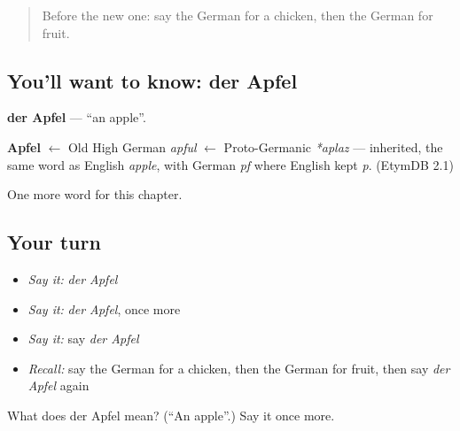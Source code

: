 \begin{quote}
Before the new one: say the German for a chicken, then the German for fruit.
\end{quote}

\subsection*{You'll want to know: der Apfel}
\textbf{der Apfel} — \textquotedblleft{}an apple\textquotedblright{}.

\begin{cousinweb}
\textbf{Apfel} $\leftarrow$ Old High German \emph{apful} $\leftarrow$ Proto-Germanic \emph{*aplaz} — inherited, the same word as English \emph{apple}, with German \emph{pf} where English kept \emph{p}. (EtymDB 2.1)
\end{cousinweb}

\begin{grammarlens}[title={What you've built}]
One more word for this chapter.
\end{grammarlens}

\subsection*{Your turn}
\begin{itemize}
\raggedright
  \item \emph{Say it:} \emph{der Apfel}
  \item \emph{Say it:} \emph{der Apfel}, once more
  \item \emph{Say it:} say \emph{der Apfel}
  \item \emph{Recall:} say the German for a chicken, then the German for fruit, then say \emph{der Apfel} again
\end{itemize}

\begin{tcolorbox}[breakable,colback=teal!4,colframe=teal!35!black,title={Before you move on}]
What does der Apfel mean? (\textquotedblleft{}An apple\textquotedblright{}.) Say it once more.
\end{tcolorbox}

